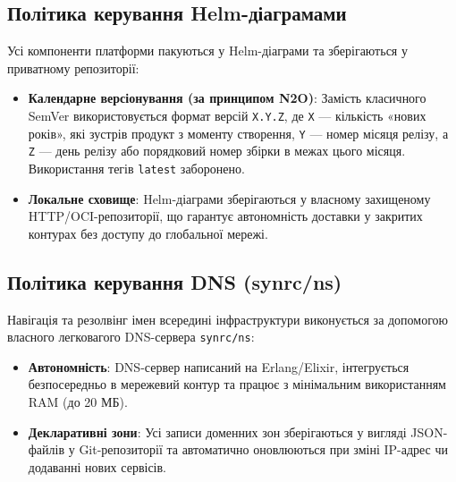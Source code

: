 \documentclass{article}
\begin{document}
\subsection{Політика керування Helm-діаграмами}
Усі компоненти платформи пакуються у Helm-діаграми та зберігаються у приватному репозиторії:
\begin{itemize}
    \item \textbf{Календарне версіонування (за принципом N2O)}: Замість класичного SemVer використовується формат версій \texttt{X.Y.Z}, де \texttt{X} — кількість «нових років», які зустрів продукт з моменту створення, \texttt{Y} — номер місяця релізу, а \texttt{Z} — день релізу або порядковий номер збірки в межах цього місяця. Використання тегів \texttt{latest} заборонено.
    \item \textbf{Локальне сховище}: Helm-діаграми зберігаються у власному захищеному HTTP/OCI-репозиторії, що гарантує автономність доставки у закритих контурах без доступу до глобальної мережі.
\end{itemize}

\subsection{Політика керування DNS (synrc/ns)}
Навігація та резолвінг імен всередині інфраструктури виконується за допомогою власного легковагого DNS-сервера \texttt{synrc/ns}:
\begin{itemize}
    \item \textbf{Автономність}: DNS-сервер написаний на Erlang/Elixir, інтегрується безпосередньо в мережевий контур та працює з мінімальним використанням RAM (до 20 МБ).
    \item \textbf{Декларативні зони}: Усі записи доменних зон зберігаються у вигляді JSON-файлів у Git-репозиторії та автоматично оновлюються при зміні IP-адрес чи додаванні нових сервісів.
\end{itemize}
\end{document}
